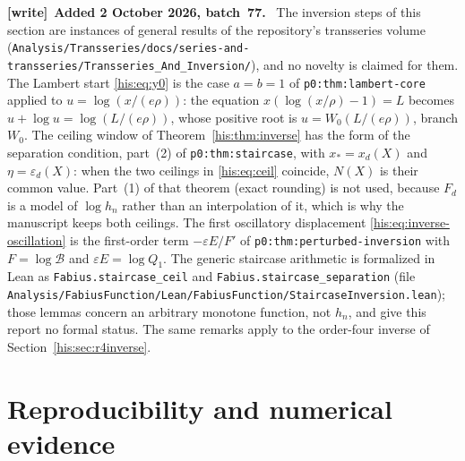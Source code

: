 \documentclass[11pt]{article}
\theoremstyle{remark}\newtheorem{remark}[theorem]{Remark}
\newcommand{\eps}{\varepsilon}
\numberwithin{equation}{section}
\newenvironment{writenote}[1][]{\par\smallskip\begingroup\small
 \noindent\textbf{[write]}\if\relax\detokenize{#1}\relax\else~\textbf{#1.}\fi\ }%
 {\par\endgroup\smallskip}
\begin{document}
\begin{writenote}[Added 2 October 2026, batch~77]
The inversion steps of this section are instances of general results of the
repository's transseries volume (\texttt{Analysis/\allowbreak Transseries/\allowbreak docs/\allowbreak series-\allowbreak and-\allowbreak transseries/\allowbreak Transseries\_And\_Inversion/}), and no novelty is claimed for
them. The Lambert start \eqref{his:eq:y0} is the case $a=b=1$ of
\texttt{p0:thm:lambert-core} applied to $u=\log(x/(e\rho))$: the equation
$x(\log(x/\rho)-1)=L$ becomes $u+\log u=\log(L/(e\rho))$, whose positive root
is $u=W_0(L/(e\rho))$, branch $W_0$. The ceiling window of
Theorem~\ref{his:thm:inverse} has the form of the separation condition, part~(2)
of \texttt{p0:thm:staircase}, with $x_\ast=x_d(X)$ and $\eta=\eps_d(X)$: when
the two ceilings in \eqref{his:eq:ceil} coincide, $N(X)$ is their common value.
Part~(1) of that theorem (exact rounding) is not used, because $F_d$ is a model
of $\log h_n$ rather than an interpolation of it, which is why the manuscript
keeps both ceilings. The first oscillatory displacement \eqref{his:eq:inverse-oscillation}
is the first-order term $-\varepsilon E/F'$ of \texttt{p0:thm:perturbed-inversion}
with $F=\log\mathcal B$ and $\varepsilon E=\log Q_1$. The generic staircase
arithmetic is formalized in Lean as \texttt{Fabius.staircase\_ceil} and
\texttt{Fabius.staircase\_separation} (file
\texttt{Analysis/\allowbreak FabiusFunction/\allowbreak Lean/\allowbreak FabiusFunction/\allowbreak StaircaseInversion.lean});
those lemmas concern an arbitrary monotone function, not $h_n$, and give this
report no formal status. The same remarks apply to the order-four inverse of
Section~\ref{his:sec:r4inverse}.
\end{writenote}



\section{Reproducibility and numerical evidence}\label{his:sec:repro}
\end{document}
